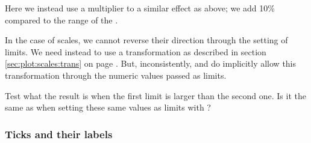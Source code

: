 \documentclass[krantz2]{krantz}\usepackage{knitr}
\begin{document}
Here we instead use a multiplier to a similar effect as above; we add 10\% compared to the range of the .

\begin{knitrout}\footnotesize
{}\color{fgcolor}\begin{kframe}
\begin{alltt}
  \hlstd{(} \hlstd{=} \hlstd{(} \hlstd{=} \hlstd{(}\hlstd{,} \hlstd{)))}
\end{alltt}
\end{kframe}
\end{knitrout}

In the case of scales, we cannot reverse their direction through the setting of limits. We need instead to use a transformation as described in section \ref{sec:plot:scales:trans} on page \pageref{sec:plot:scales:trans}. But, inconsistently,  and  do implicitly allow this transformation through the numeric values passed as limits.


\begin{playground}
Test what the result is when the first limit is larger than the second one. Is it the same as when setting these same values as limits with ?

\begin{knitrout}\footnotesize
{}\color{fgcolor}\begin{kframe}
\begin{alltt}
  \hlopt{+} \hlstd{()} \hlopt{+}
  \hlstd{(} \hlstd{=} \hlstd{(}\hlstd{,} \hlstd{))}
\end{alltt}
\end{kframe}
\end{knitrout}
\end{playground}

\subsubsection{Ticks and their labels}\label{sec:plot:scales:ticks}
\end{document}
